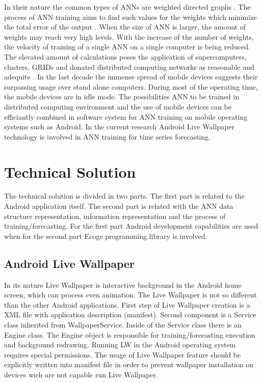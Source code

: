 \documentclass{llncs}
\begin{document}
In their nature the common types of ANNs are weighted directed graphs \cite{balabanov03}. The process of ANN training aims to find such values for the weights which minimize the total error of the output \cite{balabanov04}. When the size of ANN is larger, the amount of weights may reach very high levels. With the increase of the number of weights, the velocity of training of a single ANN on a single computer is being reduced. The elevated amount of calculations poses the application of supercomputers, clusters, GRIDs and donated distributed computing networks as reasonable and adequite \cite{balabanov01,balabanov02,keremedchiev01,tomov01}. In the last decade the immense spread of mobile devices suggests their surpassing usage over stand alone computers. During most of the operating time, the mobile devices are in idle mode. The possibilities ANN to be trained in distributed computing environment and the use of mobile devices can be efficiantly combined in software system for ANN training on mobile operating systems such as Android. In the current research Android Live Wallpaper technology is involved in ANN training for time series forecasting.

\section{Technical Solution}

The technical solution is divided in two parts. The first part is related to the Android application itself. The second part is related with the ANN data structure representation, information representation and the process of training/forecasting. For the first part Android development capabilities are used when for the second part Ecoge programming library is involved. 

\subsection{Android Live Wallpaper}

In its nature Live Wallpaper is interactive background in the Android home screen, which can process even animation. The Live Wallpaper is not so different than the other Android applications. First step of Live Wallpaper creation is a XML file with application description (manifest). Second component is a Service class inherited from WallpaperService. Inside of the Service class there is an Engine class. The Engine object is responsible for training/forecasting execution and background redrawing. Running LW in the Android operating system requires special permissions. The usage of Live Wallpaper feature should be explicitly written into manifest file in order to prevent wallpaper installation on devices wich are not capable run Live Wallpaper. 
\end{document}
